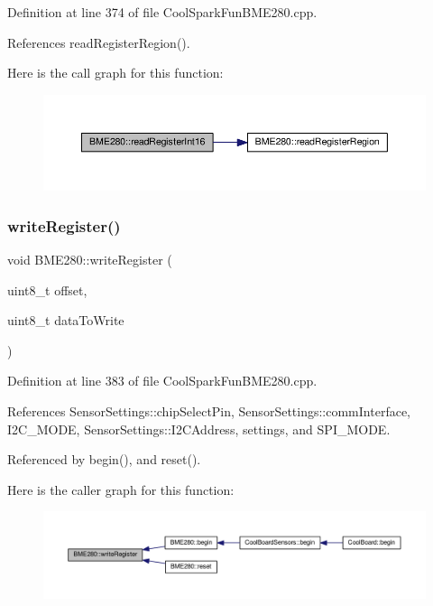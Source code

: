 Definition at line 374 of file Cool\+Spark\+Fun\+B\+M\+E280.\+cpp.



References read\+Register\+Region().

Here is the call graph for this function\+:\nopagebreak
\begin{figure}[H]
\begin{center}
\leavevmode
\includegraphics[width=350pt]{df/dcf/class_b_m_e280_ac43c30f9b321d301694094d6b4bebe7e_cgraph}
\end{center}
\end{figure}
\mbox{\label{class_b_m_e280_afcff21c342725246bf415d7f0e4d04f0}} 
\subsubsection{\texorpdfstring{write\+Register()}{writeRegister()}}
{\footnotesize\ttfamily void B\+M\+E280\+::write\+Register (\begin{DoxyParamCaption}\item[{uint8\+\_\+t}]{offset,  }\item[{uint8\+\_\+t}]{data\+To\+Write }\end{DoxyParamCaption})}



Definition at line 383 of file Cool\+Spark\+Fun\+B\+M\+E280.\+cpp.



References Sensor\+Settings\+::chip\+Select\+Pin, Sensor\+Settings\+::comm\+Interface, I2\+C\+\_\+\+M\+O\+DE, Sensor\+Settings\+::\+I2\+C\+Address, settings, and S\+P\+I\+\_\+\+M\+O\+DE.



Referenced by begin(), and reset().

Here is the caller graph for this function\+:\nopagebreak
\begin{figure}[H]
\begin{center}
\leavevmode
\includegraphics[width=350pt]{df/dcf/class_b_m_e280_afcff21c342725246bf415d7f0e4d04f0_icgraph}
\end{center}
\end{figure}



